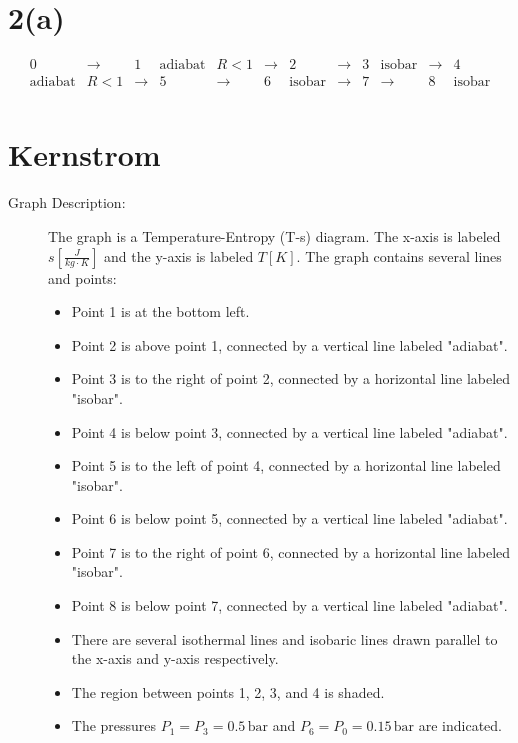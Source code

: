\section*{2(a)}

\[
\begin{array}{cccccccccccc}
0 & \rightarrow & 1 & \text{adiabat} & R < 1 & \rightarrow & 2 & \rightarrow & 3 & \text{isobar} & \rightarrow & 4 \\
\text{adiabat} & R < 1 & \rightarrow & 5 & \rightarrow & 6 & \text{isobar} & \rightarrow & 7 & \rightarrow & 8 & \text{isobar} \\
\end{array}
\]

\section*{Kernstrom}

\begin{description}
\item[Graph Description:] The graph is a Temperature-Entropy (T-s) diagram. The x-axis is labeled $s \left[ \frac{J}{kg \cdot K} \right]$ and the y-axis is labeled $T [K]$. The graph contains several lines and points:
\begin{itemize}
    \item Point 1 is at the bottom left.
    \item Point 2 is above point 1, connected by a vertical line labeled "adiabat".
    \item Point 3 is to the right of point 2, connected by a horizontal line labeled "isobar".
    \item Point 4 is below point 3, connected by a vertical line labeled "adiabat".
    \item Point 5 is to the left of point 4, connected by a horizontal line labeled "isobar".
    \item Point 6 is below point 5, connected by a vertical line labeled "adiabat".
    \item Point 7 is to the right of point 6, connected by a horizontal line labeled "isobar".
    \item Point 8 is below point 7, connected by a vertical line labeled "adiabat".
    \item There are several isothermal lines and isobaric lines drawn parallel to the x-axis and y-axis respectively.
    \item The region between points 1, 2, 3, and 4 is shaded.
    \item The pressures $P_1 = P_3 = 0.5 \, \text{bar}$ and $P_6 = P_0 = 0.15 \, \text{bar}$ are indicated.
\end{itemize}
\end{description}